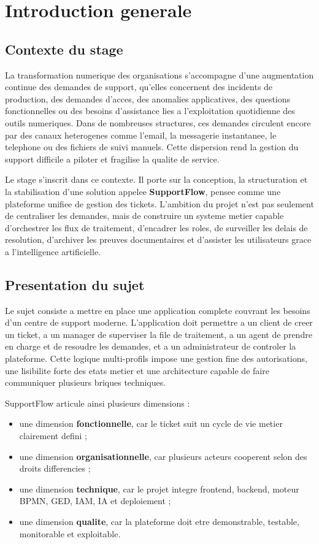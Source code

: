 \chapter{Introduction generale}

\section{Contexte du stage}

La transformation numerique des organisations s'accompagne d'une augmentation continue des demandes de support, qu'elles concernent des incidents de production, des demandes d'acces, des anomalies applicatives, des questions fonctionnelles ou des besoins d'assistance lies a l'exploitation quotidienne des outils numeriques. Dans de nombreuses structures, ces demandes circulent encore par des canaux heterogenes comme l'email, la messagerie instantanee, le telephone ou des fichiers de suivi manuels. Cette dispersion rend la gestion du support difficile a piloter et fragilise la qualite de service.

Le stage s'inscrit dans ce contexte. Il porte sur la conception, la structuration et la stabilisation d'une solution appelee \textbf{SupportFlow}, pensee comme une plateforme unifiee de gestion des tickets. L'ambition du projet n'est pas seulement de centraliser les demandes, mais de construire un systeme metier capable d'orchestrer les flux de traitement, d'encadrer les roles, de surveiller les delais de resolution, d'archiver les preuves documentaires et d'assister les utilisateurs grace a l'intelligence artificielle.

\section{Presentation du sujet}

Le sujet consiste a mettre en place une application complete couvrant les besoins d'un centre de support moderne. L'application doit permettre a un client de creer un ticket, a un manager de superviser la file de traitement, a un agent de prendre en charge et de resoudre les demandes, et a un administrateur de controler la plateforme. Cette logique multi-profils impose une gestion fine des autorisations, une lisibilite forte des etats metier et une architecture capable de faire communiquer plusieurs briques techniques.

SupportFlow articule ainsi plusieurs dimensions :

\begin{itemize}[leftmargin=1.2cm]
  \item une dimension \textbf{fonctionnelle}, car le ticket suit un cycle de vie metier clairement defini ;
  \item une dimension \textbf{organisationnelle}, car plusieurs acteurs cooperent selon des droits differencies ;
  \item une dimension \textbf{technique}, car le projet integre frontend, backend, moteur BPMN, GED, IAM, IA et deploiement ;
  \item une dimension \textbf{qualite}, car la plateforme doit etre demonstrable, testable, monitorable et exploitable.
\end{itemize}


